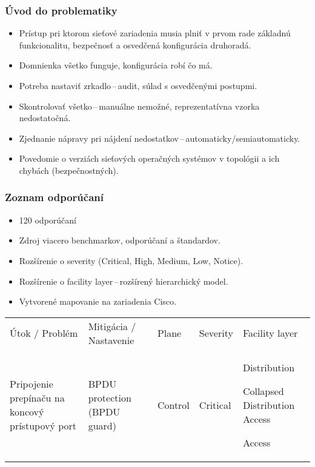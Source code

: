 \documentclass[%
  12pt,       				%
	t,                  %
	aspectratio=1610,   %
	unicode,						%
]{beamer}				    	%
\begin{document}
\begin{frame} 
	\frametitle{Úvod do problematiky}
	\begin{itemize}
		\vspace{1em}
		\item Prístup pri ktorom sieťové zariadenia musia plniť v prvom rade základnú funkcionalitu, bezpečnosť a osvedčená konfigurácia druhoradá.
		
		\item Domnienka všetko funguje, konfigurácia robí čo má.
		
		\item Potreba nastaviť zrkadlo\,--\,audit, súlad s osvedčenými postupmi.
		
		\item Skontrolovať všetko\,--\,manuálne nemožné, reprezentatívna vzorka nedostatočná.
		
		\item Zjednanie nápravy pri nájdení nedostatkov\,--\,automaticky/semiautomaticky.
		
		\item Povedomie o verziách sieťových operačných systémov v topológii a ich chybách (bezpečnostných).
	\end{itemize}
	
\end{frame} 


\begin{frame} 
	\frametitle{Zoznam odporúčaní}
		\begin{itemize}
				\item 120 odporúčaní
				\item Zdroj viacero benchmarkov, odporúčaní a štandardov.
				\item Rozšírenie o severity (Critical, High, Medium, Low, Notice).
				\item Rozšírenie o facility layer\,--\,rozšírený hierarchický model.
				\item Vytvorené mapovanie na zariadenia Cisco.
		\end{itemize}

	\begin{table}
	\scriptsize
		\begin{tabular}[!htbp]{|L{11em}L{10em}C{3.1em}C{3.3em}C{13em}|}
		
		\hline	
			
		Útok / Problém	&Mitigácia / Nastavenie	&Plane	&Severity	&Facility layer\\ \hhline{=====} 

			
		Pripojenie prepínaču na koncový prístupový port & BPDU protection (BPDU guard)&Control	&Critical	&Distribution
		
		Collapsed Distribution Access
		
		Access \\ \hline
		\end{tabular}
	\end{table}
\end{frame}
\end{document}
